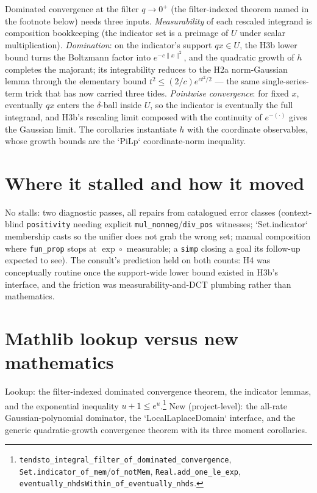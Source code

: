 \documentclass[11pt]{article}
\begin{document}
Dominated convergence at the filter $q \to 0^+$ (the filter-indexed
theorem named in the footnote below) needs three inputs. \emph{Measurability} of each rescaled integrand
is composition bookkeeping (the indicator set is a preimage of $U$
under scalar multiplication). \emph{Domination}: on the indicator's
support $qx \in U$, the H3b lower bound turns the Boltzmann factor
into $e^{-c\|x\|^2}$, and the quadratic growth of $h$ completes the
majorant; its integrability reduces to the H2a norm-Gaussian lemma
through the elementary bound $t^2 \le (2/c)e^{ct^2/2}$ --- the same
single-series-term trick that has now carried three tides.
\emph{Pointwise convergence}: for fixed $x$, eventually
$qx$ enters the $\delta$-ball inside $U$, so the indicator is
eventually the full integrand, and H3b's rescaling limit composed
with the continuity of $e^{-(\cdot)}$ gives the Gaussian limit. The
corollaries instantiate $h$ with the coordinate observables, whose
growth bounds are the `PiLp` coordinate-norm inequality.

\section{Where it stalled and how it moved}

No stalls: two diagnostic passes, all repairs from catalogued error
classes (context-blind \texttt{positivity} needing explicit
\texttt{mul\_nonneg}/\texttt{div\_pos} witnesses; `Set.indicator`
membership casts so the unifier does not grab the wrong set; manual
composition where \texttt{fun\_prop} stops at
$\exp \circ$ measurable; a \texttt{simp} closing a goal its follow-up
expected to see). The consult's prediction held on both counts: H4
was conceptually routine once the support-wide lower bound existed
in H3b's interface, and the friction was measurability-and-DCT
plumbing rather than mathematics.

\section{Mathlib lookup versus new mathematics}

Lookup: the filter-indexed dominated convergence theorem, the
indicator lemmas, and the exponential inequality
$u + 1 \le e^u$.\footnote{\texttt{tendsto\_integral\_filter\_of\_dominated\_convergence},
\texttt{Set.indicator\_of\_mem}/\texttt{of\_notMem},
\texttt{Real.add\_one\_le\_exp},
\texttt{eventually\_nhdsWithin\_of\_eventually\_nhds}.}
New (project-level): the all-rate Gaussian-polynomial dominator, the
`LocalLaplaceDomain` interface, and the generic quadratic-growth
convergence theorem with its three moment corollaries.
\end{document}
